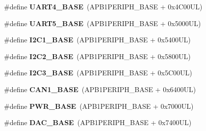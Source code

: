 \begin{DoxyCompactItemize}
\mbox{\label{group___peripheral__memory__map_ga94d92270bf587ccdc3a37a5bb5d20467}} 
\#define {\bfseries U\+A\+R\+T4\+\_\+\+B\+A\+SE}~(A\+P\+B1\+P\+E\+R\+I\+P\+H\+\_\+\+B\+A\+SE + 0x4\+C00\+U\+L)
\item 
\mbox{\label{group___peripheral__memory__map_gaa155689c0e206e6994951dc3cf31052a}} 
\#define {\bfseries U\+A\+R\+T5\+\_\+\+B\+A\+SE}~(A\+P\+B1\+P\+E\+R\+I\+P\+H\+\_\+\+B\+A\+SE + 0x5000\+U\+L)
\item 
\mbox{\label{group___peripheral__memory__map_gacd72dbffb1738ca87c838545c4eb85a3}} 
\#define {\bfseries I2\+C1\+\_\+\+B\+A\+SE}~(A\+P\+B1\+P\+E\+R\+I\+P\+H\+\_\+\+B\+A\+SE + 0x5400\+U\+L)
\item 
\mbox{\label{group___peripheral__memory__map_ga04bda70f25c795fb79f163b633ad4a5d}} 
\#define {\bfseries I2\+C2\+\_\+\+B\+A\+SE}~(A\+P\+B1\+P\+E\+R\+I\+P\+H\+\_\+\+B\+A\+SE + 0x5800\+U\+L)
\item 
\mbox{\label{group___peripheral__memory__map_ga4e8b9198748235a1729e1e8f8f24983b}} 
\#define {\bfseries I2\+C3\+\_\+\+B\+A\+SE}~(A\+P\+B1\+P\+E\+R\+I\+P\+H\+\_\+\+B\+A\+SE + 0x5\+C00\+U\+L)
\item 
\mbox{\label{group___peripheral__memory__map_gad8e45ea6c032d9fce1b0516fff9d8eaa}} 
\#define {\bfseries C\+A\+N1\+\_\+\+B\+A\+SE}~(A\+P\+B1\+P\+E\+R\+I\+P\+H\+\_\+\+B\+A\+SE + 0x6400\+U\+L)
\item 
\mbox{\label{group___peripheral__memory__map_gac691ec23dace8b7a649a25acb110217a}} 
\#define {\bfseries P\+W\+R\+\_\+\+B\+A\+SE}~(A\+P\+B1\+P\+E\+R\+I\+P\+H\+\_\+\+B\+A\+SE + 0x7000\+U\+L)
\item 
\mbox{\label{group___peripheral__memory__map_gad18d0b914c7f68cecbee1a2d23a67d38}} 
\#define {\bfseries D\+A\+C\+\_\+\+B\+A\+SE}~(A\+P\+B1\+P\+E\+R\+I\+P\+H\+\_\+\+B\+A\+SE + 0x7400\+U\+L)
\item 
\mbox{\label{group___peripheral__memory__map_ga3150e4b10ec876c0b20f22de12a8fa40}} 

\end{DoxyCompactItemize}
